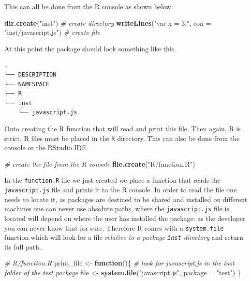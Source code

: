 \documentclass[
]{krantz}
\makeatletter
\newenvironment{Shaded}{\begin{snugshade}}{\end{snugshade}}
\newcommand{\CommentTok}[1]{\textcolor[rgb]{0.37,0.37,0.37}{\textit{#1}}}
\newcommand{\ControlFlowTok}[1]{\textcolor[rgb]{0.27,0.27,0.27}{\textbf{#1}}}
\newcommand{\DataTypeTok}[1]{\textcolor[rgb]{0.27,0.27,0.27}{#1}}
\newcommand{\KeywordTok}[1]{\textcolor[rgb]{0.27,0.27,0.27}{\textbf{#1}}}
\newcommand{\NormalTok}[1]{#1}
\newcommand{\StringTok}[1]{\textcolor[rgb]{0.5,0.5,0.5}{#1}}
\newenvironment{kframe}{%
\medskip{}
\setlength{\fboxsep}{.8em}
 \def\at@end@of@kframe{}%
 \ifinner\ifhmode%
  \def\at@end@of@kframe{\end{minipage}}%
  \begin{minipage}{\columnwidth}%
 \fi\fi%
 \def\FrameCommand##1{\hskip\@totalleftmargin \hskip-\fboxsep
 \colorbox{shadecolor}{##1}\hskip-\fboxsep
     \hskip-\linewidth \hskip-\@totalleftmargin \hskip\columnwidth}%
 \MakeFramed {\advance\hsize-\width
   \@totalleftmargin\z@ \linewidth\hsize
   \@setminipage}}%
 {\par\unskip\endMakeFramed%
 \at@end@of@kframe}
\renewenvironment{Shaded}{\begin{kframe}}{\end{kframe}}
\makeatother
\begin{document}
This can all be done from the R console as shown below.

\begin{Shaded}
\begin{Highlighting}[]
\KeywordTok{dir.create}\NormalTok{(}\StringTok{"inst"}\NormalTok{) }\CommentTok{\# create directory}
\KeywordTok{writeLines}\NormalTok{(}\StringTok{"var x = 3;"}\NormalTok{, }\DataTypeTok{con =} \StringTok{"inst/javascript.js"}\NormalTok{) }\CommentTok{\# create file}
\end{Highlighting}
\end{Shaded}

At this point the package should look something like this.

\begin{verbatim}
.
├── DESCRIPTION
├── NAMESPACE
├── R
└── inst
    └── javascript.js
\end{verbatim}

Onto creating the R function that will read and print this file. Then again, R is strict, R files must be placed in the \texttt{R} directory. This can also be done from the console or the RStudio IDE.

\begin{Shaded}
\begin{Highlighting}[]
\CommentTok{\# create the file from the R console}
\KeywordTok{file.create}\NormalTok{(}\StringTok{"R/function.R"}\NormalTok{)}
\end{Highlighting}
\end{Shaded}

In the \texttt{function.R} file we just created we place a function that reads the \texttt{javascript.js} file and prints it to the R console. In order to read the file one needs to locate it, as packages are destined to be shared and installed on different machines one can never use absolute paths, where the \texttt{javascript.js} file is located will depend on where the user has installed the package: as the developer you can never know that for sure. Therefore R comes with a \texttt{system.file} function which will look for a file \emph{relative to a package \texttt{inst} directory} and return its full path.

\begin{Shaded}
\begin{Highlighting}[]
\CommentTok{\# R/function.R}
\NormalTok{print\_file \textless{}{-}}\StringTok{ }\ControlFlowTok{function}\NormalTok{()\{}
  \CommentTok{\# look for javascript.js in the inst folder of the test package}
\NormalTok{  file \textless{}{-}}\StringTok{ }\KeywordTok{system.file}\NormalTok{(}\StringTok{"javascript.js"}\NormalTok{, }\DataTypeTok{package =} \StringTok{"test"}\NormalTok{)}
\NormalTok{\}}
\end{Highlighting}
\end{Shaded}
\end{document}
